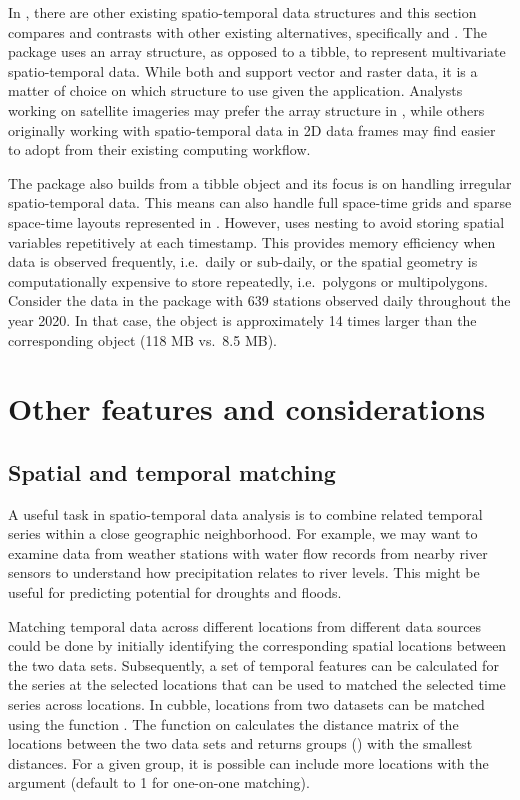 \documentclass[
  shortnames]{jss}
\begin{document}
In , there are other existing spatio-temporal data structures and this section compares and contrasts  with other existing alternatives, specifically  and . The  package \citep{stars} uses an array structure, as opposed to a tibble, to represent multivariate spatio-temporal data. While both  and  support vector and raster data, it is a matter of choice on which structure to use given the application. Analysts working on satellite imageries may prefer the array structure in , while others originally working with spatio-temporal data in 2D data frames may find  easier to adopt from their existing computing workflow.

The  package \citep{sftime} also builds from a tibble object and its focus is on handling irregular spatio-temporal data. This means  can also handle full space-time grids and sparse space-time layouts represented in . However,  uses nesting to avoid storing spatial variables repetitively at each timestamp. This provides memory efficiency when data is observed frequently, i.e.~daily or sub-daily, or the spatial geometry is computationally expensive to store repeatedly, i.e.~polygons or multipolygons. Consider the  data in the  package with 639 stations observed daily throughout the year 2020. In that case, the  object is approximately 14 times larger than the corresponding  object (118 MB vs.~8.5 MB).

\hypertarget{others}{%
\section{Other features and considerations}\label{others}}

\hypertarget{matching}{%
\subsection{Spatial and temporal matching}\label{matching}}

A useful task in spatio-temporal data analysis is to combine related temporal series within a close geographic neighborhood. For example, we may want to examine data from weather stations with water flow records from nearby river sensors to understand how precipitation relates to river levels. This might be useful for predicting potential for droughts and floods.

Matching temporal data across different locations from different data sources could be done by initially identifying the corresponding spatial locations between the two data sets. Subsequently, a set of temporal features can be calculated for the series at the selected locations that can be used to matched the selected time series across locations. In cubble, locations from two datasets can be matched using the function . The function on calculates the distance matrix of the locations between the two data sets and returns groups () with the smallest distances. For a given group, it is possible can include more locations with the argument  (default to 1 for one-on-one matching).
\end{document}
